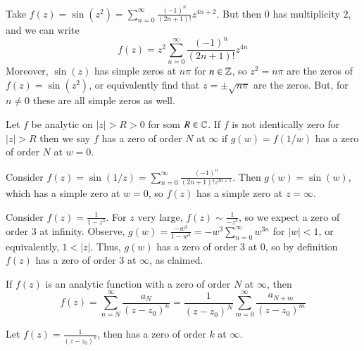 \documentclass[12pt, a4paper, oneside, openright, titlepage]{book}
\begin{document}
\begin{eg}
    Take $f(z) = \sin(z^2) = \sum\limits_{n=0}^{\infty}\frac{(-1)^n}{(2n+1)!}z^{4n+2}$. But then $0$ has multiplicity $2$, and we can write \begin{equation*}
        f(z) = z^2 \sum_{n=0}^{\infty}\frac{(-1)^n}{(2n+1)!}z^{4n}
    \end{equation*}
    Moreover, $\sin(z)$ has simple zeros at $n\pi$ for $n \in \mathbb Z$, so $z^2 = n\pi$ are the zeros of $f(z) = \sin(z^2)$, or equivalently find that $z = \pm\sqrt{n\pi}$ are the zeros. But, for $n \neq 0$ these are all simple zeros as well.
\end{eg}

\begin{defn}
    Let $f$ be analytic on $|z| > R > 0$ for som $R \in \mathbb C$. If $f$ is not identically zero for $|z| > R$ then we say $f$ has a zero of order $N$ at $\infty$ if $g(w) = f(1/w)$ has a zero of order $N$ at $w = 0$.
\end{defn}


\begin{eg}
    Consider $f(z) = \sin(1/z) = \sum_{n=0}^{\infty}\frac{(-1)^n}{(2n+1)!z^{2n+1}}$. Then $g(w) = \sin(w)$, which has a simple zero at $w = 0$, so $f(z)$ has a simple zero at $z = \infty$.
\end{eg}


\begin{eg}
    Consider $f(z) = \frac{1}{1-z^3}$. For $z$ very large, $f(z) \sim \frac{1}{-z^3}$, so we expect a zero of order $3$ at infinity. Observe, $g(w) = \frac{-w^3}{1-w^3} = -w^3\sum_{n=0}^{\infty}w^{3n}$ for $|w| < 1$, or equivalently, $1 < |z|$. Thus, $g(w)$ has a zero of order $3$ at $0$, so by definition $f(z)$ has a zero of order $3$ at $\infty$, as claimed.
\end{eg}

\begin{thm}
    If $f(z)$ is an analytic function with a zero of order $N$ at $\infty$, then \begin{equation*}
        f(z) = \sum_{n=N}^{\infty}\frac{a_N}{(z-z_0)^n} = \frac{1}{(z-z_0)^N}\sum_{m=0}^{\infty}\frac{a_{N+m}}{(z-z_0)^m}
    \end{equation*}
\end{thm}

\begin{eg}
    Let $f(z) = \frac{1}{(z-z_0)^k}$, then has a zero of order $k$ at $\infty$.
\end{eg}
\end{document}

